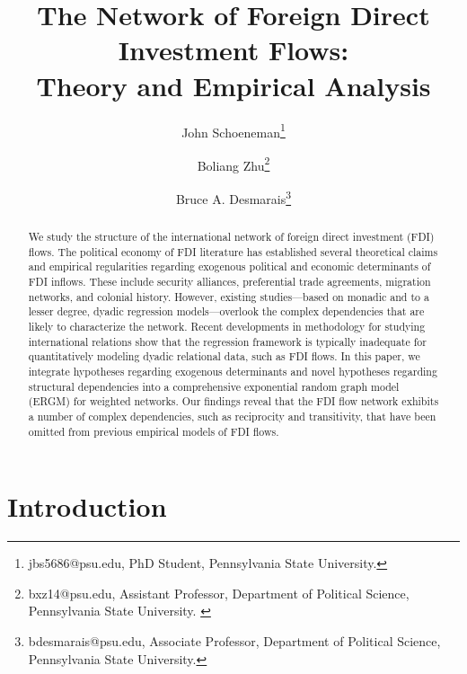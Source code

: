 \documentclass{article}
\begin{document}
\title{The Network of Foreign Direct Investment Flows: \\Theory and Empirical Analysis}
\author{John  Schoeneman\thanks{\footnotesize{
jbs5686@psu.edu, PhD Student, Pennsylvania State University.}} \and Boliang Zhu\thanks{\footnotesize{bxz14@psu.edu, Assistant Professor, Department of Political Science, Pennsylvania State University. }} \and Bruce A. Desmarais\thanks{\footnotesize{
bdesmarais@psu.edu, Associate Professor, Department of Political Science, Pennsylvania State University.}}}
\date{}
\maketitle

\singlespacing
\begin{abstract} 
    \noindent We study the structure of the international network of foreign direct investment (FDI) flows. The political economy of FDI literature has established several theoretical claims and empirical regularities regarding exogenous political and economic determinants of FDI inflows. These include security alliances, preferential trade agreements, migration networks, and colonial history. However, existing studies---based on monadic and to a lesser degree, dyadic regression models---overlook the complex dependencies that are likely to characterize the network. Recent developments in methodology for studying international relations show that the regression framework is typically inadequate for quantitatively modeling dyadic relational data, such as FDI flows. In this paper, we integrate hypotheses regarding exogenous determinants and novel hypotheses regarding structural dependencies into a comprehensive exponential random graph model (ERGM) for weighted networks. Our findings reveal that the FDI flow network  exhibits a number of complex dependencies, such as reciprocity and transitivity, that have been omitted from previous empirical models of FDI flows.

\end{abstract}

\section{Introduction}
\end{document}

